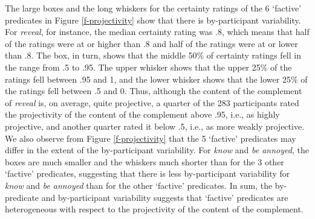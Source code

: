 \documentclass[11pt,fleqn]{article}
\newcommand{\6}{\mbox{$[\hspace*{-.6mm}[$}}
\newcommand{\9}{\mbox{$]\hspace*{-.6mm}]$}}
\begin{document}
The large boxes and the long whiskers for the certainty ratings of the 6 `factive' predicates in Figure \ref{f-projectivity} show that there is by-participant variability. For {\em reveal}, for instance, the median certainty rating was .8, which means that half of the ratings were at or higher than .8 and half of the ratings were at or lower than .8. The box, in turn, shows that the middle 50\% of certainty ratings fell in the range from .5 to .95. The upper whisker shows that the upper 25\% of the ratings fell between .95 and 1, and the lower whisker shows that the lower 25\% of the ratings fell between .5 and 0. Thus, although the content of the complement of {\em reveal} is, on average, quite projective, a quarter of the 283 participants rated the projectivity of the content of the complement above .95, i.e., as highly projective, and another quarter rated it below .5, i.e., as more weakly projective. We also observe from Figure \ref{f-projectivity} that the 5 `factive' predicates may differ in the extent of the by-participant variability. For {\em know} and {\em be annoyed}, the boxes are much smaller and the whiskers much shorter than for the 3 other `factive' predicates, suggesting that there is less by-participant variability for {\em know} and {\em be annoyed} than for the other `factive' predicates. In sum, the by-predicate and by-participant variability suggests that `factive' predicates are heterogeneous with respect to the projectivity of the content of the complement.
\end{document}
